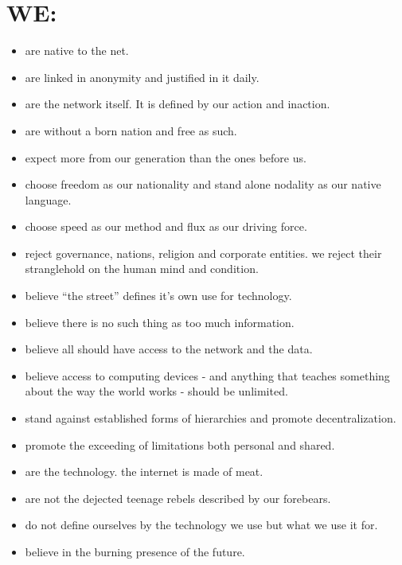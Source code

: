 \documentclass[letterpaper,12pt,english]{sphinxmanual}
\begin{document}
\section{WE:}
\label{2011:we}\begin{itemize}
\item {} 
are native to the net.

\item {} 
are linked in anonymity and justified in it daily.

\item {} 
are the network itself. It is defined by our action and inaction.

\item {} 
are without a born nation and free as such.

\item {} 
expect more from our generation than the ones before us.

\item {} 
choose freedom as our nationality and stand alone nodality as our native language.

\item {} 
choose speed as our method and flux as our driving force.

\item {} 
reject governance, nations, religion and corporate entities. we reject their stranglehold on the human mind and condition.

\item {} 
believe ``the street'' defines it's own use for technology.

\item {} 
believe there is no such thing as too much information.

\item {} 
believe all should have access to the network and the data.

\item {} 
believe access to computing devices - and anything that teaches something about the way the world works - should be unlimited.

\item {} 
stand against established forms of hierarchies and promote decentralization.

\item {} 
promote the exceeding of limitations both personal and shared.

\item {} 
are the technology. the internet is made of meat.

\item {} 
are not the dejected teenage rebels described by our forebears.

\item {} 
do not define ourselves by the technology we use but what we use it for.

\item {} 
believe in the burning presence of the future.

\end{itemize}
\end{document}

